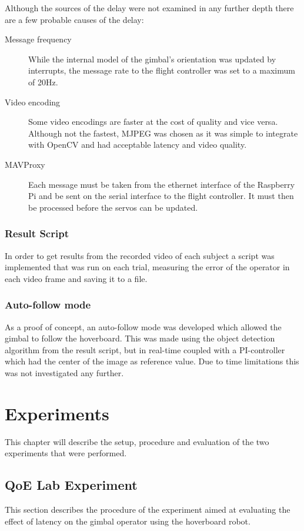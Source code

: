 \documentclass[nofilelist]{cslthse-msc}
\begin{document}
Although the sources of the delay were not examined in any further depth there are a few probable causes of the delay:
\begin{description}
   \item[Message frequency] 
   While the internal model of the gimbal's orientation was updated by interrupts, the message rate to the flight controller was set to a maximum of 20Hz.
   
   \item [Video encoding]
   Some video encodings are faster at the cost of quality and vice versa. Although not the fastest, MJPEG was chosen as it was simple to integrate with OpenCV and had acceptable latency and video quality.
   
   \item[MAVProxy] Each message must be taken from the ethernet interface of the Raspberry Pi and be sent on the serial interface to the flight controller. It must then be processed before the servos can be updated. 
   
\end{description}

\subsection{Result Script}
In order to get results from the recorded video of each subject a script was implemented that was run on each trial, measuring the error of the operator in each video frame and saving it to a file.

\subsection{Auto-follow mode}
As a proof of concept, an auto-follow mode was developed which allowed the gimbal to follow the hoverboard. This was made using the object detection algorithm from the result script, but in real-time coupled with a PI-controller which had the center of the image as reference value. Due to time limitations this was not investigated any further.

\chapter{Experiments}
This chapter will describe the setup, procedure and evaluation of the two experiments that were performed.

\section{QoE Lab Experiment}
This section describes the procedure of the experiment aimed at evaluating the effect of latency on the gimbal operator using the hoverboard robot.   
\end{document}
